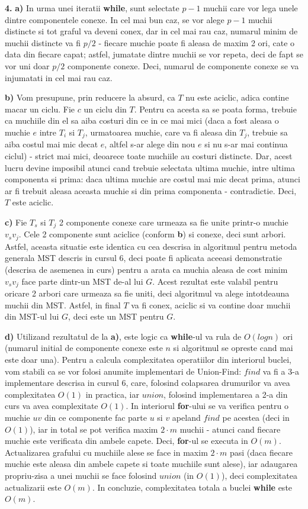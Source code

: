 \documentclass{article}
\begin{document}
{\bf 4.} {\bf a)} In urma unei iteratii {\bf while}, sunt selectate $p-1$ muchii care vor lega unele dintre componentele conexe. In cel mai bun caz, se vor alege $p-1$ muchii distincte si tot graful va deveni conex, dar in cel mai rau caz, numarul minim de muchii distincte va fi $p/2$ - fiecare muchie poate fi aleasa de maxim 2 ori, cate o data din fiecare capat; astfel, jumatate dintre muchii se vor repeta, deci de fapt se vor uni doar $p/2$ componente conexe. Deci, numarul de componente conexe se va injumatati in cel mai rau caz.

{\bf b)} Vom presupune, prin reducere la absurd, ca $T$ nu este aciclic, adica contine macar un ciclu. Fie $c$ un ciclu din $T$. Pentru ca acesta sa se poata forma, trebuie ca muchiile din el sa aiba costuri din ce in ce mai mici (daca a fost aleasa o muchie $e$ intre $T_i$ si $T_j$, urmatoarea muchie, care va fi aleasa din $T_j$, trebuie sa aiba costul mai mic decat $e$, altfel s-ar alege din nou $e$ si nu s-ar mai continua ciclul) - strict mai mici, deoarece toate muchiile au costuri distincte. Dar, acest lucru devine imposibil atunci cand trebuie selectata ultima muchie, intre ultima componenta si prima: daca ultima muchie are costul mai mic decat prima, atunci ar fi trebuit aleasa aceasta muchie si din prima componenta - contradictie. Deci, $T$ este aciclic.


{\bf c)} Fie $T_s$ si $T_j$ 2 componente conexe care urmeaza sa fie unite printr-o muchie $v_sv_j$. Cele 2 componente sunt aciclice (conform {\bf b}) si conexe, deci sunt arbori. Astfel, aceasta situatie este identica cu cea descrisa in algoritmul pentru metoda generala MST descris in cursul 6, deci poate fi aplicata aceeasi demonstratie (descrisa de asemenea in curs) pentru a arata ca muchia aleasa de cost minim $v_sv_j$ face parte dintr-un MST de-al lui $G$. Acest rezultat este valabil pentru oricare 2 arbori care urmeaza sa fie uniti, deci algoritmul va alege intotdeauna muchii din MST. Astfel, in final $T$ va fi conex, aciclic si va contine doar muchii din MST-ul lui $G$, deci este un MST pentru $G$. 

{\bf d)} Utilizand rezultatul de la {\bf a)}, este logic ca {\bf while}-ul va rula de $O(logn)$ ori (numarul initial de componente conexe este $n$ si algoritmul se opreste cand mai este doar una). Pentru a calcula complexitatea operatiilor din interiorul buclei, vom stabili ca se vor folosi anumite implementari de Union-Find: $find$ va fi a 3-a implementare descrisa in cursul 6, care, folosind colapsarea drumurilor va avea complexitatea $O(1)$ in practica, iar $union$, folosind implementarea a 2-a din curs va avea complexitate $O(1)$. In interiorul {\bf for}-ului se va verifica pentru o muchie $uv$ din ce componente fac parte $u$ si $v$ apeland $find$ pe acestea (deci in $O(1)$), iar in total se pot verifica maxim $2 \cdot m$ muchii - atunci cand fiecare muchie este verificata din ambele capete. Deci, {\bf for}-ul se executa in $O(m)$. Actualizarea grafului cu muchiile alese se face in maxim $2 \cdot m$ pasi (daca fiecare muchie este aleasa din ambele capete si toate muchiile sunt alese), iar adaugarea propriu-zisa a unei muchii se face folosind $union$ (in $O(1)$), deci complexitatea actualizarii este $O(m)$. In concluzie, complexitatea totala a buclei {\bf while} este $O(m)$.
\end{document}
